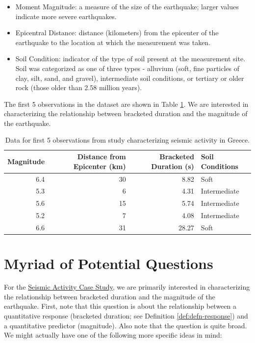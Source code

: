 \documentclass[]{book}
\providecommand{\tightlist}{%
  \setlength{\itemsep}{0pt}\setlength{\parskip}{0pt}}
\theoremstyle{plain}
\theoremstyle{mydefn}
\theoremstyle{myexmpl}
\theoremstyle{remark}
\begin{document}
\begin{itemize}
\tightlist
\item
  Moment Magnitude: a measure of the size of the earthquake; larger
  values indicate more severe earthquakes.
\item
  Epicentral Distance: distance (kilometers) from the epicenter of the
  earthquake to the location at which the measurement was taken.
\item
  Soil Condition: indicator of the type of soil present at the
  measurement site. Soil was categorized as one of three types -
  alluvium (soft, fine particles of clay, silt, sand, and gravel),
  intermediate soil conditions, or tertiary or older rock (those older
  than 2.58 million years).
\end{itemize}

The first 5 observations in the dataset are shown in Table
\ref{tab:casegreece-table}. We are interested in characterizing the
relationship between bracketed duration and the magnitude of the
earthquake.

\begin{table}

\caption{\label{tab:casegreece-table}Data for first 5 observations from study characterizing seismic activity in Greece.}
\centering
\begin{tabular}[t]{r|r|r|l}
\hline
Magnitude & Distance from Epicenter (km) & Bracketed Duration (s) & Soil Conditions\\
\hline
6.4 & 30 & 8.82 & Soft\\
\hline
5.3 & 6 & 4.31 & Intermediate\\
\hline
5.6 & 15 & 5.74 & Intermediate\\
\hline
5.2 & 7 & 4.08 & Intermediate\\
\hline
6.6 & 31 & 28.27 & Soft\\
\hline
\end{tabular}
\end{table}

\chapter{Myriad of Potential Questions}\label{Regquestions}

For the \protect\hyperlink{CaseGreece}{Seismic Activity Case Study}, we
are primarily interested in characterizing the relationship between
bracketed duration and the magnitude of the earthquake. First, note that
this question is about the relationship between a quantitative response
(bracketed duration; see Definition \ref{def:defn-response}) and a
quantitative predictor (magnitude). Also note that the question is quite
broad. We might actually have one of the following more specific ideas
in mind:
\end{document}
